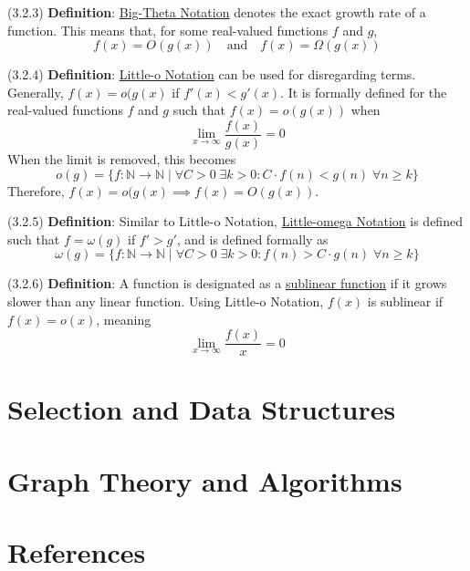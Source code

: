 \documentclass{article}
\newcommand{\separate}[1] {\vspace{#1 pt}\noindent}
\newcommand{\N}{\mathbb{N}}
\newcommand{\definition}[2]{(#1) \textbf{Definition}: #2}
\begin{document}
\separate{5}\definition{3.2.3}{\underline{Big-Theta Notation} denotes the exact growth rate of a function. This means that, for some real-valued functions \(f\) and \(g\),}
\begin{equation}
    f(x) = O(g(x)) \quad\text{and}\quad f(x)=\Omega(g(x))
\end{equation}

\separate{5}\definition{3.2.4}{\underline{Little-o Notation} can be used for disregarding \say{small-order} terms. Generally, \(f(x) = o(g(x)\) if \(f'(x) < g'(x)\). It is formally defined for the real-valued functions \(f\) and \(g\) such that \(f(x) = o(g(x))\) when}
\begin{equation}
    \lim_{x\rightarrow\infty} \frac{f(x)}{g(x)} = 0
\end{equation}
When the limit is removed, this becomes
\begin{equation}
    o(g) = \{f: \N \rightarrow \N \;|\; \forall C > 0 \;\exists k > 0 : C \cdot f(n) < g(n) \;\forall n \geq k \} 
\end{equation}
Therefore, \(f(x) = o(g(x) \implies f(x) = O(g(x))\).

\newpage\noindent\definition{3.2.5}{Similar to Little-o Notation, \underline{Little-omega Notation} is defined such that \(f=\omega(g)\) if \(f' > g'\),}
and is defined formally as
\begin{equation}
    \omega(g) = \{f: \N \rightarrow \N \;|\; \forall C > 0 \;\exists k > 0 : f(n) > C \cdot g(n) \;\forall n \geq k \} 
\end{equation}

\separate{5}\definition{3.2.6}{A function is designated as a \underline{sublinear function} if it grows slower than any linear function. Using Little-o Notation, \(f(x)\) is sublinear if \(f(x) = o(x)\), meaning}
\begin{equation}
    \lim_{x \rightarrow \infty} \frac{f(x)}{x} = 0
\end{equation}

\newpage\part{Selection and Data Structures}\label{part:3.sds}

\newpage\part{Graph Theory and Algorithms}\label{part:4.gta}

\newpage\part{References}
\end{document}

